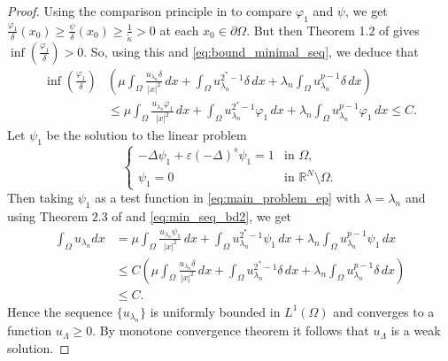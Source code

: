 \documentclass[11pt]{article}
\newcommand{\om} {\Omega}
\newcommand{\la} {\lambda}
\newcommand{\La} {\Lambda}
\newcommand{\ka}{\kappa}
\begin{document}
\begin{proof}
 Using the comparison principle in \cite[Theorem 5.2]{biswas2025mixed} to compare $\varphi_1$ and $\psi$, we get ${\frac{\varphi_1}{\delta}(x_0)} \geq \frac{\psi}{\delta}(x_0)\geq \frac{1}{\tilde \ka}> 0$ at each $x_0 \in \partial \Omega$. But then Theorem 1.2 of \cite{biswas2023boundary} gives $\inf{\left( \frac{\varphi_1}{\delta}\right)} > 0$. So, using this and \eqref{eq:bound_minimal_seq}, we deduce that
 \begin{equation}\label{eq:min_seq_bd2}
 \begin{aligned}
     \inf{\left( \frac{\varphi_1}{\delta}\right)} &\left( \mu \int_{\Omega} \frac{ u_{\la_n} \delta}{|x|^2} \, dx + \int_{\Omega} u_{\la_n}^{2^*-1} \delta \, dx 
+ \lambda_n \int_{\Omega} u_{\la_n}^{p-1} \delta \, dx\right) \\
& \leq \mu \int_{\Omega} \frac{ u_{\la_n} \varphi_1}{|x|^2} \, dx 
+ \int_{\Omega} u_{\la_n}^{2^*-1} \varphi_1 \, dx 
+ \lambda_n \int_{\Omega} u_{\la_n}^{p-1} \varphi_1 \, dx \leq C .
\end{aligned}
 \end{equation}
 Let $\psi_1$ be the solution to the linear problem 
 \begin{equation*}
\begin{cases}
-\Delta \psi_1 + \varepsilon (-\Delta)^s \psi_1 = 1 & \text{in } \Omega, \\[8pt]
\psi_1 = 0 & \text{in } \mathbb{R}^N \setminus \Omega.
\end{cases}
\end{equation*}
Then taking $\psi_1$ as a test function in \eqref{eq:main_problem_ep} with $\la = \la_n$ and using Theorem $2.3$ of \cite{dhanya2026interior} and \eqref{eq:min_seq_bd2}, we get
\begin{align*}
    \int_{\om} u_{\la_n}dx & = \mu \int_{\Omega} \frac{ u_{\la_n} \psi_1}{|x|^2} \, dx 
+ \int_{\Omega} u_{\la_n}^{2^*-1} \psi_1 \, dx 
+ \lambda_n \int_{\Omega} u_{\la_n}^{p-1} \psi_1 \, dx \\
&  \leq C \left( \mu \int_{\Omega} \frac{ u_{\la_n} \delta}{|x|^2} \, dx + \int_{\Omega} u_{\la_n}^{2^*-1} \delta \, dx 
+ \lambda_n \int_{\Omega} u_{\la_n}^{p-1} \delta \, dx \right)\\
& \leq C.
\end{align*}
Hence the sequence $\{ u_{\la_n}\}$ is uniformly bounded in $L^1(\om)$ and converges to a function $u_{\La} \geq 0$. By monotone convergence theorem it follows that $u_{\La}$ is a weak solution.
 \end{proof}
\end{document}
